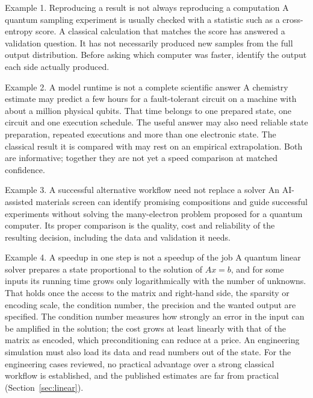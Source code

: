\documentclass[10pt,a4paper]{article}
\begin{document}
\begin{exbox}{Example 1. Reproducing a result is not always reproducing a computation}
A quantum sampling experiment is usually checked with a statistic such as a cross-entropy score. A classical calculation that matches the score has answered a validation question. It has not necessarily produced new samples from the full output distribution. Before asking which computer was faster, identify the output each side actually produced.
\end{exbox}
\begin{exbox}{Example 2. A model runtime is not a complete scientific answer}
A chemistry estimate may predict a few hours for a fault-tolerant circuit on a machine with about a million physical qubits. That time belongs to one prepared state, one circuit and one execution schedule. The useful answer may also need reliable state preparation, repeated executions and more than one electronic state. The classical result it is compared with may rest on an empirical extrapolation. Both are informative; together they are not yet a speed comparison at matched confidence.
\end{exbox}
\begin{exbox}{Example 3. A successful alternative workflow need not replace a solver}
An AI-assisted materials screen can identify promising compositions and guide successful experiments without solving the many-electron problem proposed for a quantum computer. Its proper comparison is the quality, cost and reliability of the resulting decision, including the data and validation it needs.
\end{exbox}
\begin{exbox}{Example 4. A speedup in one step is not a speedup of the job}
A quantum linear solver prepares a state proportional to the solution of $Ax=b$, and for some inputs its running time grows only logarithmically with the number of unknowns. That holds once the access to the matrix and right-hand side, the sparsity or encoding scale, the condition number, the precision and the wanted output are specified. The condition number measures how strongly an error in the input can be amplified in the solution; the cost grows at least linearly with that of the matrix as encoded, which preconditioning can reduce at a price. An engineering simulation must also load its data and read numbers out of the state. For the engineering cases reviewed, no practical advantage over a strong classical workflow is established, and the published estimates are far from practical (Section~\ref{sec:linear}).
\end{exbox}
\end{document}
